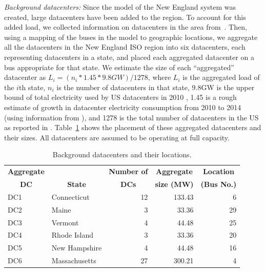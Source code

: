 {\em Background datacenters:} Since the model of the New England system was created, large datacenters have been added to the region.  To account for this added load, we collected information on datacenters in the area from~\cite{DCmap}.  Then, using a mapping of the buses in the model to geographic locations, we aggregate all the datacenters in the New England ISO region into six datacenters, each representing datacenters in a state, and placed each aggregated datacenter on a bus appropriate for that state.  We estimate the size of each ``aggregated'' datacenter as 
$L_i=(n_i* 1.45 * 9.8GW)/1278$, where $L_i$ is the aggregated load of the $i$th state, $n_i$ is the number of datacenters in that state, 9.8GW is the upper bound of total electricity used by US datacenters in 2010 \cite{Koomey2011}, 1.45 is a rough estimate of growth in datacenter electricity consumption from 2010 to 2014 (using information from \cite{Koomey2011}), 
and 1278 is the total number of datacenters in the US as reported in \cite{DCmap}.
Table~\ref{tab:dc_setting} shows the placement of these aggregated
datacenters and their sizes.  All datacenters are assumed to be
operating at full capacity.

\begin{table}[ht]
\begin{center}
\caption{Background datacenters and their locations.}
\begin{tabular}{|l|l|r|r|r|}
\hline
\multicolumn{1}{|c|}{\bf Aggregate} &  & \multicolumn{1}{c|}{\bf Number of}
& \multicolumn{1}{c|}{\bf Aggregate} & \multicolumn{1}{c|}{\bf Location} \\
\multicolumn{1}{|c|}{\bf DC} & \multicolumn{1}{c|}{\bf State} &
\multicolumn{1}{c|}{\bf DCs} & \multicolumn{1}{c|}{\bf size (MW)} &
\multicolumn{1}{c|}{\bf (Bus No.)}\\ 
\hline
DC1 & Connecticut & 12 &133.43 & 6\\
DC2 & Maine & 3 &33.36 & 29 \\
DC3 & Vermont & 4 &44.48 & 25 \\
DC4 & Rhode Island & 3 &33.36 & 20\\
DC5 & New Hampshire & 4& 44.48 & 16\\
DC6 & Massachusetts & 27& 300.21 & 4 \\
\hline

\end{tabular}
   \vspace{.05in}
\label{tab:dc_setting}
\end{center}
\end{table}



